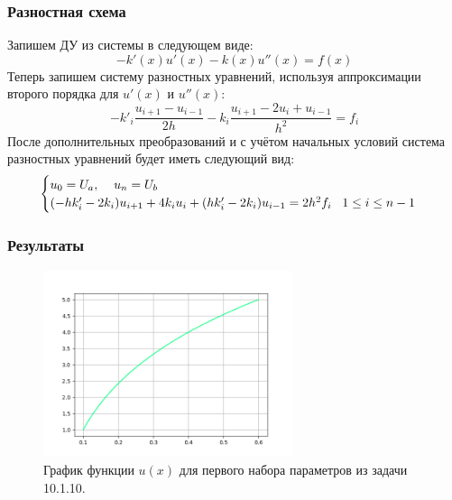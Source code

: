 \documentclass[12pt]{article}%
\begin{document}
\subsubsection{Разностная схема}
Запишем ДУ из системы в следующем виде:
\begin{equation*}
    -k'(x) u'(x) - k(x) u''(x) = f(x)
\end{equation*}
Теперь запишем систему разностных уравнений, используя аппроксимации второго порядка для $u'(x)$ и $u''(x)$:
\begin{equation*}
    -k'_i \frac{u_{i+1} - u_{i-1}}{2h} - 
    k_i \frac{u_{i+1} - 2u_i + u_{i-1}}{h^2} = f_i
\end{equation*}
После дополнительных преобразований и с учётом начальных условий система разностных уравнений будет иметь следующий вид:
\begin{equation*}
\begin{cases}
u_0 = U_a, \hspace{0.4cm} u_n = U_b \\ 
(-h k'_i - 2 k_i) u_{i+1} + 4 k_i u_i + (h k'_i - 2k_i) u_{i-1} = 2h^2 f_i\hspace{0.3cm} 1 \le i \le n-1 \\
\end{cases}
\end{equation*}

\subsubsection{Результаты}
\begin{figure}[H]
    \centering
    \includegraphics[width=0.65\textwidth]{task1.png}
    \caption{График функции $u(x)$ для первого набора параметров из задачи 10.1.10.}
\end{figure}
\end{document}
